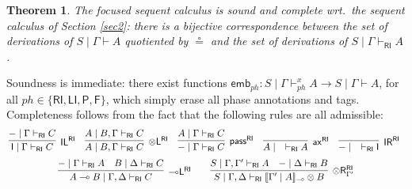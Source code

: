 \documentclass[copyright,creativecommons]{eptcs}
\newtheorem{theorem}{Theorem}[section]
\newtheorem{lemma}[theorem]{Lemma}
\theoremstyle{definition}
\newcommand{\ldbc}{[\![}
\newcommand{\rdbc}{]\!]}
\newcommand{\tl}{\otimes \mathsf{L}}
\newcommand{\tr}{\otimes \mathsf{R}}
\newcommand{\lleft}{{\multimap}\mathsf{L}}
\newcommand{\pass}{\mathsf{pass}}
\newcommand{\unitl}{\mathsf{IL}}
\newcommand{\unitr}{\mathsf{IR}}
\newcommand{\ax}{\mathsf{ax}}
\newcommand{\ot}{\otimes}
\newcommand{\lolli}{\multimap}
\newcommand{\I}{\mathsf{I}}
\newcommand{\RI}{\mathsf{RI}}
\newcommand{\LI}{\mathsf{LI}}
\newcommand{\Pass}{\mathsf{P}}
\newcommand{\F}{\mathsf{F}}
\newcommand{\NMILL}{\texttt{NMILL}}
\newcommand{\SkNMILL}{\NMILL\textsuperscript{\textit{s}}}
\begin{document}
 \begin{theorem}
   The focused sequent calculus is sound and complete wrt.\ the  sequent calculus of Section \ref{sec2}: there is a bijective correspondence between the set of derivations of $S \mid \Gamma \vdash A$ quotiented by $\circeq$ and the set of derivations of $S \mid \Gamma \vdash_\RI A$.
 \end{theorem}
Soundness is immediate: there exist functions $\mathsf{emb}_{ph} : S \mid \Gamma \vdash^x_{ph} A \to S \mid \Gamma \vdash A$, for all $ph \in \{\RI,\LI,\Pass, \F \}$, which simply erase all phase annotations and tags. Completeness follows from the fact that the following rules are all admissible: %
\vspace{-.1cm}
\begin{equation}\label{eq:admis}
  \begin{array}{c}
    \hspace{-3.9pt}
    \infer[\unitl^{\RI}]{\I \mid \Gamma \vdash_{\RI} C}{{-} \mid \Gamma \vdash_{\RI} C}
    \quad
    \infer[\tl^{\RI}]{A \mid B, \Gamma \vdash_{\RI} C}{A \mid B, \Gamma \vdash_{\RI} C}
    \quad
    \infer[\pass^{\RI}]{{-} \mid \Gamma \vdash_{\RI} C}{A \mid \Gamma \vdash_{\RI} C}
    \quad
    \infer[\ax^{\RI}]{A \mid \quad \vdash_{\RI} A}{}
    \quad
    \infer[\unitr^{\RI}]{{-} \mid \quad \vdash_{\RI} \I}{}
\\[6pt]
    \infer[\lleft^{\RI}]{A \lolli B \mid \Gamma , \Delta \vdash_{\RI} C}{
    {-} \mid \Gamma \vdash_{\RI} A
    &
    B \mid \Delta \vdash_{\RI} C
    }
    \qquad
    \infer[\tr_{\Gamma'}^{\RI}]{S \mid \Gamma , \Delta \vdash_{\RI} \ldbc \Gamma' \mid A \rdbc_{\lolli} \ot B}{
      S \mid \Gamma , \Gamma' \vdash_{\RI} A
      &
      {-} \mid \Delta \vdash_{\RI} B
    }
  \end{array}
\end{equation}
\end{document}
